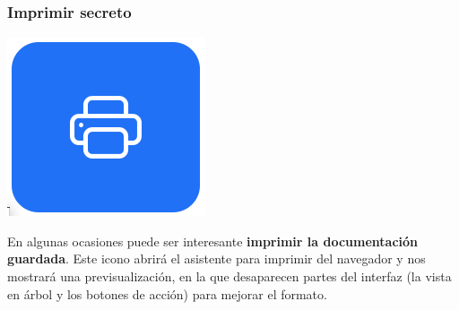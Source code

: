\documentclass{\ClassPath/viu-tfm-template}
\begin{document}
\subsubsection*{Imprimir secreto}
{
\begin{minipage}{0.1\linewidth}
    \includegraphics[width=\linewidth]{img/print.png}
\end{minipage}
\hspace{0.5cm}
\begin{minipage}{0.9\linewidth}
    En algunas ocasiones puede ser interesante \textbf{imprimir la documentación guardada}. Este icono abrirá el asistente para imprimir del navegador y nos mostrará una previsualización, en la que desaparecen partes del interfaz (la vista en árbol y los botones de acción) para mejorar el formato.
\end{minipage}
}
\end{document}
